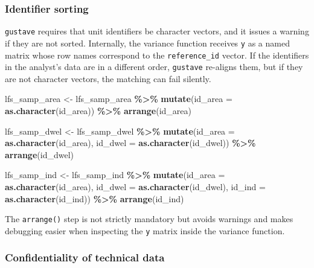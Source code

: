 \documentclass[
]{article}
\newenvironment{Shaded}{\begin{snugshade}}{\end{snugshade}}
\newcommand{\AttributeTok}[1]{\textcolor[rgb]{0.13,0.29,0.53}{#1}}
\newcommand{\FunctionTok}[1]{\textcolor[rgb]{0.13,0.29,0.53}{\textbf{#1}}}
\newcommand{\NormalTok}[1]{#1}
\newcommand{\OtherTok}[1]{\textcolor[rgb]{0.56,0.35,0.01}{#1}}
\newcommand{\SpecialCharTok}[1]{\textcolor[rgb]{0.81,0.36,0.00}{\textbf{#1}}}
\begin{document}
\subsubsection{Identifier sorting}\label{identifier-sorting}

\texttt{gustave} requires that unit identifiers be character vectors,
and it issues a warning if they are not sorted. Internally, the variance
function receives \texttt{y} as a named matrix whose row names
correspond to the \texttt{reference\_id} vector. If the identifiers in
the analyst's data are in a different order, \texttt{gustave} re-aligns
them, but if they are not character vectors, the matching can fail
silently.

\begin{Shaded}
\begin{Highlighting}[]
\NormalTok{lfs\_samp\_area }\OtherTok{\textless{}{-}}\NormalTok{ lfs\_samp\_area }\SpecialCharTok{\%\textgreater{}\%}
  \FunctionTok{mutate}\NormalTok{(}\AttributeTok{id\_area =} \FunctionTok{as.character}\NormalTok{(id\_area)) }\SpecialCharTok{\%\textgreater{}\%}
  \FunctionTok{arrange}\NormalTok{(id\_area)}

\NormalTok{lfs\_samp\_dwel }\OtherTok{\textless{}{-}}\NormalTok{ lfs\_samp\_dwel }\SpecialCharTok{\%\textgreater{}\%}
  \FunctionTok{mutate}\NormalTok{(}\AttributeTok{id\_area =} \FunctionTok{as.character}\NormalTok{(id\_area),}
         \AttributeTok{id\_dwel  =} \FunctionTok{as.character}\NormalTok{(id\_dwel)) }\SpecialCharTok{\%\textgreater{}\%}
  \FunctionTok{arrange}\NormalTok{(id\_dwel)}

\NormalTok{lfs\_samp\_ind }\OtherTok{\textless{}{-}}\NormalTok{ lfs\_samp\_ind }\SpecialCharTok{\%\textgreater{}\%}
  \FunctionTok{mutate}\NormalTok{(}\AttributeTok{id\_area =} \FunctionTok{as.character}\NormalTok{(id\_area),}
         \AttributeTok{id\_dwel  =} \FunctionTok{as.character}\NormalTok{(id\_dwel),}
         \AttributeTok{id\_ind  =} \FunctionTok{as.character}\NormalTok{(id\_ind)) }\SpecialCharTok{\%\textgreater{}\%}
  \FunctionTok{arrange}\NormalTok{(id\_ind)}
\end{Highlighting}
\end{Shaded}

The \texttt{arrange()} step is not strictly mandatory but avoids
warnings and makes debugging easier when inspecting the \texttt{y}
matrix inside the variance function.

\subsubsection{Confidentiality of technical
data}\label{confidentiality-of-technical-data}
\end{document}
